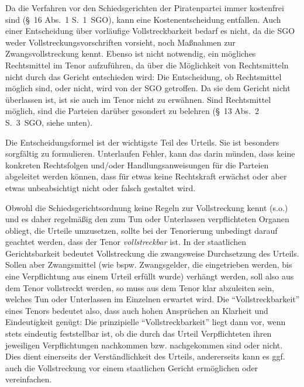 Da die Verfahren vor den Schiedsgerichten der Piratenpartei immer kostenfrei sind (\S~16 Abs.~1 S.~1~SGO), kann eine Kostenentscheidung entfallen. Auch einer Entscheidung über vorläufige Vollstreckbarkeit bedarf es nicht, da die SGO weder Vollstreckungsvorschriften vorsieht, noch Maßnahmen zur Zwangsvollstreckung kennt. Ebenso ist nicht notwendig, ein mögliches Rechtsmittel im Tenor aufzuführen, da über die Möglichkeit von Rechtsmitteln nicht durch das Gericht entschieden wird: Die Entscheidung, ob Rechtsmittel möglich sind, oder nicht, wird von der SGO getroffen. Da sie dem Gericht nicht überlassen ist, ist sie auch im Tenor nicht zu erwähnen. Sind Rechtsmittel möglich, sind die Parteien darüber gesondert zu belehren (\S~13 Abs.~2 S.~3~SGO, siehe unten).

Die Entscheidungsformel ist der wichtigste Teil des Urteils. Sie ist besonders sorgfältig zu formulieren. Unterlaufen Fehler, kann das darin münden, dass keine konkreten Rechtsfolgen und/oder Handlungsanweisungen für die Parteien abgeleitet werden können, dass für etwas keine Rechtskraft erwächst oder aber etwas unbeabsichtigt nicht oder falsch gestaltet wird.

Obwohl die Schiedsgerichtsordnung keine Regeln zur Vollstreckung kennt (s.o.) und es daher regelmäßig den zum Tun oder Unterlassen verpflichteten Organen obliegt, die Urteile umzusetzen, sollte bei der Tenorierung unbedingt darauf geachtet werden, dass der Tenor \emph{vollstreckbar} ist. In der staatlichen Gerichtsbarkeit bedeutet Vollstreckung die zwangsweise Durchsetzung des Urteils. Sollen aber Zwangsmittel (wie bspw. Zwangsgelder, die eingetrieben werden, bis eine Verpflichtung aus einem Urteil erfüllt wurde) verhängt werden, soll also aus dem Tenor vollstreckt werden, so muss aus dem Tenor klar abzuleiten sein, welches Tun oder Unterlassen im Einzelnen erwartet wird. Die \enquote{Vollstreckbarkeit} eines Tenors bedeutet also, dass auch hohen Ansprüchen an Klarheit und Eindeutigkeit genügt: Die prinzipielle \enquote{Vollstreckbarkeit} liegt dann vor, wenn stets eindeutig feststellbar ist, ob die durch das Urteil Verpflichteten ihren jeweiligen Verpflichtungen nachkommen bzw. nachgekommen sind oder nicht. Dies dient einerseits der Verständlichkeit des Urteils, andererseits kann es ggf. auch die Vollstreckung vor einem staatlichen Gericht ermöglichen oder vereinfachen.

